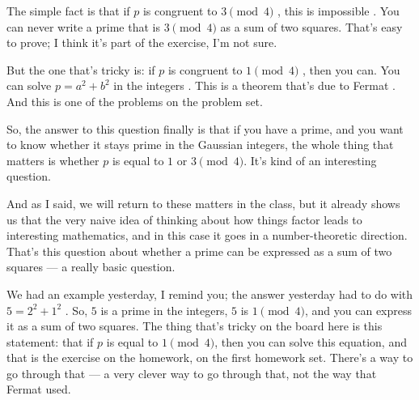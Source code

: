 \begin{speech}[00:06:08 - 00:08:12]
The simple fact is that if $p$ is congruent to $3 \pmod 4$ , this is impossible . You can never write a prime that is $3 \pmod 4$ as a sum of two squares. That's easy to prove; I think it's part of the exercise, I'm not sure.

But the one that's tricky is: if $p$ is congruent to $1 \pmod 4$ , then you can. You can solve $p = a^2 + b^2$ in the integers . This is a theorem that's due to Fermat . And this is one of the problems on the problem set.

So, the answer to this question finally is that if you have a prime, and you want to know whether it stays prime in the Gaussian integers, the whole thing that matters is whether $p$ is equal to $1$ or $3 \pmod 4$. It's kind of an interesting question.

And as I said, we will return to these matters in the class, but it already shows us that the very naive idea of thinking about how things factor leads to interesting mathematics, and in this case it goes in a number-theoretic direction. That's this question about whether a prime can be expressed as a sum of two squares --- a really basic question.

We had an example yesterday, I remind you; the answer yesterday had to do with $5 = 2^2 + 1^2$ . So, $5$ is a prime in the integers, $5$ is $1 \pmod 4$, and you can express it as a sum of two squares. The thing that's tricky on the board here is this statement: that if $p$ is equal to $1 \pmod 4$, then you can solve this equation, and that is the exercise on the homework, on the first homework set. There's a way to go through that --- a very clever way to go through that, not the way that Fermat used.
\end{speech}

